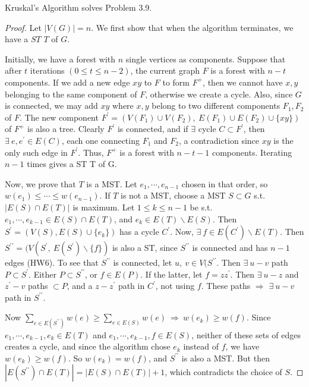 \begin{theorem}
    Kruskal's Algorithm solves Problem 3.9.
\end{theorem}
\begin{proof}
    Let $|V(G)| = n$. We first show that when the algorithm terminates, we have a $ST$ $T$ of $G$. 

    Initially, we have a forest with $n$ single vertices as components. Suppose that after $t$ iterations $(0\leqslant t\leqslant n-2)$, the current graph $F$ is a forest with $n-t$ components. If we add a new edge $xy$ to $F$ to form $F^+$, then we cannot have $x, y$ belonging to the same component of $F$, otherwise we create a cycle. Also, since $G$ is connected, we may add $xy$ where $x, y$ belong to two different components $F_1, F_2$ of $F$. The new component $F^{\prime} = \left(V(F_1)\cup V(F_2),\ E(F_1)\cup E(F_2) \cup\{xy\} \right)$ of $F^+$ is also a tree. Clearly $F^{\prime}$ is connected, and if $\exists$ cycle $C\subset F^{\prime}$, then $\exists\ e, e^{\prime}\in E(C)$, each one connecting $F_1$ and $F_2$, a contradiction since $xy$ is the only such edge in $F^{\prime}$. Thus, $F^+$ is a forest with $n-t-1$ components. Iterating $n-1$ times gives a ST T of G.

    Now, we prove that $T$ is a MST. Let $e_1,\cdots, e_{n-1}$ chosen in that order, so $w(e_1)\leqslant\cdots\leqslant w(e_{n-1})$. If $T$ is not a MST, choose a MST $S\subset G$ s.t. $|E(S)\cap E(T)|$ is maximum. Let $1\leqslant k \leqslant n-1$ be s.t. $e_1,\cdots, e_{k-1}\in E(S)\cap E(T)$, and $e_k\in E(T)\backslash E(S)$. Then $S^{\prime} = (V(S), E(S)\cup\{e_k\})$ has a cycle $C^{\prime}$. Now, $\exists\ f\in E(C^{\prime})\backslash E(T)$. Then $S^{\prime\prime} = (V(S^{\prime},\ E(S^{\prime})\backslash\{f\})$ is also a ST, since $S^{\prime\prime}$ is connected and has $n-1$ edges (HW6). To see that $S^{\prime\prime}$ is connected, let $u,\ v\in V(S^{\prime\prime}$. Then $\exists\ u-v$ path $P\subset S^{\prime}$. Either $P\subset S^{\prime\prime}$, or $f\in E(P)$. If the latter, let $f= zz^{\prime}$. Then $\exists\ u-z$ and $z^{\prime}-v$ paths $\subset P$, and a $z-z^{\prime}$ path in $C^{\prime}$, not using $f$. These paths $\Longrightarrow$ $\exists\ u-v$ path in $S^{\prime\prime}$. 

    Now $\sum\limits_{e\in E(S^{\prime\prime})} w(e) \geqslant \sum\limits_{e\in E(S)} w(e)\ \Longrightarrow\ w(e_k)\geqslant w(f)$. Since $e_1,\cdots, e_{k-1}, e_k\in E(T)$ and $e_1,\cdots, e_{k-1},f\in E(S)$, neither of these sets of edges creates a cycle, and since the algorithm chose $e_k$ instead of $f$, we have $w(e_k)\geqslant w(f)$. So $w(e_k)=w(f)$, and $S^{\prime\prime}$ is also a MST. But then $|E(S^{\prime\prime})\cap E(T)| = |E(S)\cap E(T)| + 1$, which contradicts the choice of $S$.
\end{proof}

